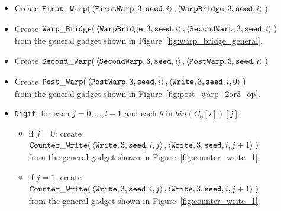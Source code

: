 \begin{itemize}
    \item Create
    $\begin{aligned}[t]
        {\tt First\_Warp}(&\left\langle {\tt FirstWarp},  3, {\tt seed}, i \right\rangle,
                    \left\langle {\tt WarpBridge}, 3, {\tt seed}, i \right\rangle \;)
    \end{aligned}$

    \item Create
    $\begin{aligned}[t]
        {\tt Warp\_Bridge}(&\left\langle {\tt WarpBridge}, 3, {\tt seed}, i \right\rangle,
                     \left\langle {\tt SecondWarp}, 3, {\tt seed}, i \right\rangle \;)
    \end{aligned}$\\ from the general gadget shown in Figure~\ref{fig:warp_bridge_general}.

    \item Create
    $\begin{aligned}[t]
        {\tt Second\_Warp}(&\left\langle {\tt SecondWarp}, 3, {\tt seed}, i  \right\rangle,
                     \left\langle {\tt PostWarp},   3, {\tt seed}, i  \right\rangle \;)
    \end{aligned}$

    \item Create
    $\begin{aligned}[t]
        {\tt Post\_Warp}(&\left\langle {\tt PostWarp}, 3, {\tt seed}, i    \right\rangle,
                   \left\langle {\tt Write},    3, {\tt seed}, i, 0 \right\rangle \;)
    \end{aligned}$\\from the general gadget shown in Figure~\ref{fig:post_warp_2or3_op}.



    \item {\tt Digit}: for each $j=0,\ldots,l-1$ and each $b$ in $bin(C_0[i])[j]$:
    \begin{itemize}
        \item if $j = 0$: create
        $\begin{aligned}[t]
            {\tt Counter\_Write}(&\left\langle {\tt Write}, 3, {\tt seed}, i, j \right\rangle, \left\langle {\tt Write}, 3, {\tt seed}, i, j + 1 \right\rangle \;)
        \end{aligned}$\\from the general gadget shown in Figure~\ref{fig:counter_write_1}.

        \item if $j = 1$: create
        $\begin{aligned}[t]
            {\tt Counter\_Write}(&\left\langle {\tt Write}, 3, {\tt seed}, i, j \right\rangle, \left\langle {\tt Write}, 3, {\tt seed}, i, j + 1 \right\rangle \;)
        \end{aligned}$\\from the general gadget shown in Figure~\ref{fig:counter_write_1}.


\end{itemize}
\end{itemize}
